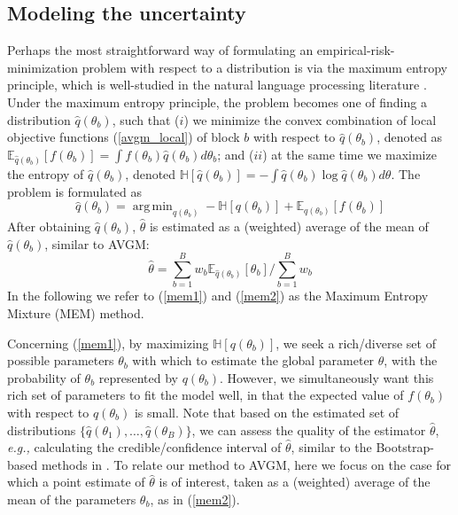 \documentclass{article}
\DeclareMathOperator*{\argmin}{arg\,min}
\newcommand{\eg}[0]{\emph{e.g., }}
\newcommand{\1}[0]{\ensuremath{\boldsymbol{1}}\xspace}
\begin{document}

\subsection{Modeling the uncertainty}\label{MEM}

Perhaps the most straightforward way of formulating an empirical-risk-minimization problem with respect to a distribution is via the maximum entropy principle, which is well-studied in the natural language processing literature \cite{Berger1996}. Under the maximum entropy principle, the problem becomes one of finding a distribution $\hat q(\theta_b)$, such that ($i$) we minimize the convex combination of local objective functions (\ref{avgm_local}) of block $b$ with respect to $\hat q(\theta_b)$, denoted as $\mathbb{E}_{\hat q(\theta_b)}[f(\theta_b)] = \int f(\theta_b)\hat q(\theta_b) d\theta_b$; and ($ii$) at the same time we maximize the entropy of $\hat q(\theta_b)$, denoted $\mathbb{H}[\hat q(\theta_b)] = -\int \hat q(\theta_b)\log  \hat q(\theta_b) d\theta$. The problem is formulated as
\begin{equation}\label{mem1}
\textstyle\hat q(\theta_b) =\argmin_{q(\theta_b)} -\mathbb{H}[q(\theta_b)] +  \mathbb{E}_{q(\theta_b) }[f(\theta_b)]
\end{equation}
After obtaining $\hat q(\theta_b)$, $\hat\theta$ is estimated as a (weighted) average of the mean of $\hat q(\theta_b)$, similar to AVGM: 
\begin{equation}\label{mem2}
\hat\theta = \textstyle\sum_{b=1}^Bw_b\mathbb{E}_{\hat q(\theta_b) }[\theta_b]/\sum_{b=1}^Bw_b
\end{equation}
In the following we refer to (\ref{mem1}) and (\ref{mem2}) as the Maximum Entropy Mixture (MEM) method. 

Concerning (\ref{mem1}), by maximizing $\mathbb{H}[q(\theta_b)]$, we seek a rich/diverse set of possible parameters $\theta_b$ with which to estimate the global parameter $\theta$, with the probability of $\theta_b$ represented by $q(\theta_b)$. However, we simultaneously want this rich set of parameters to fit the model well, in that the expected value of $f(\theta_b)$ with respect to $q(\theta_b)$ is small. Note that based on the estimated set of distributions $\{\hat q(\theta_1), \ldots, \hat q(\theta_B)\}$, we can assess the quality of the estimator $\hat\theta$, \eg calculating the credible/confidence interval of $\hat\theta$, similar to the Bootstrap-based methods in \cite{Kleiner2012}. To relate our method to AVGM, here we focus on the case for which a point estimate of $\hat\theta$ is of interest, taken as a (weighted) average of the mean of the parameters $\theta_b$, as in (\ref{mem2}).
\end{document}

